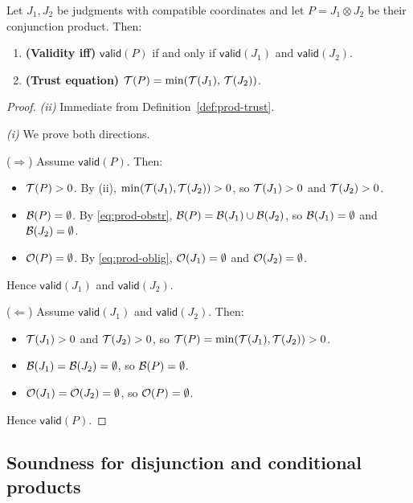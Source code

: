 \documentclass[11pt]{article}
\newcommand{\Jprod}{\mathbin{\otimes}}            %
\newcommand{\JprodN}[2]{#1 \Jprod #2}             %
\newcommand{\Valid}[1]{\mathsf{valid}(#1)}        %
\begin{document}
\begin{theorem}\label{thm:soundness}
Let $J_1, J_2$ be judgments with compatible coordinates and let
$P = \JprodN{J_1}{J_2}$ be their conjunction product.  Then:
\begin{enumerate}[label=(\roman*)]
  \item \textbf{(Validity iff)} $\Valid{P}$ if and only if $\Valid{J_1}$
        and $\Valid{J_2}$.
  \item \textbf{(Trust equation)} $\mathcal{T}(P) = \min(\mathcal{T}(J_1),\,
        \mathcal{T}(J_2))$.
\end{enumerate}
\end{theorem}
\begin{proof}
\textit{(ii)} Immediate from Definition~\ref{def:prod-trust}.

\textit{(i)} We prove both directions.

\medskip
\noindent ($\Rightarrow$)\; Assume $\Valid{P}$.  Then:
\begin{itemize}
  \item $\mathcal{T}(P) > 0$.  By (ii), $\min(\mathcal{T}(J_1), \mathcal{T}(J_2)) > 0$,
        so $\mathcal{T}(J_1) > 0$ and $\mathcal{T}(J_2) > 0$.
  \item $\mathcal{B}(P) = \emptyset$.  By \eqref{eq:prod-obstr},
        $\mathcal{B}(P) = \mathcal{B}(J_1) \cup \mathcal{B}(J_2)$, so
        $\mathcal{B}(J_1) = \emptyset$ and $\mathcal{B}(J_2) = \emptyset$.
  \item $\mathcal{O}(P) = \emptyset$.  By \eqref{eq:prod-oblig},
        $\mathcal{O}(J_1) = \emptyset$ and $\mathcal{O}(J_2) = \emptyset$.
\end{itemize}
Hence $\Valid{J_1}$ and $\Valid{J_2}$.

\medskip
\noindent ($\Leftarrow$)\; Assume $\Valid{J_1}$ and $\Valid{J_2}$.  Then:
\begin{itemize}
  \item $\mathcal{T}(J_1) > 0$ and $\mathcal{T}(J_2) > 0$, so
        $\mathcal{T}(P) = \min(\mathcal{T}(J_1), \mathcal{T}(J_2)) > 0$.
  \item $\mathcal{B}(J_1) = \mathcal{B}(J_2) = \emptyset$, so
        $\mathcal{B}(P) = \emptyset$.
  \item $\mathcal{O}(J_1) = \mathcal{O}(J_2) = \emptyset$, so
        $\mathcal{O}(P) = \emptyset$.
\end{itemize}
Hence $\Valid{P}$.
\end{proof}

\subsection{Soundness for disjunction and conditional products}
\end{document}
